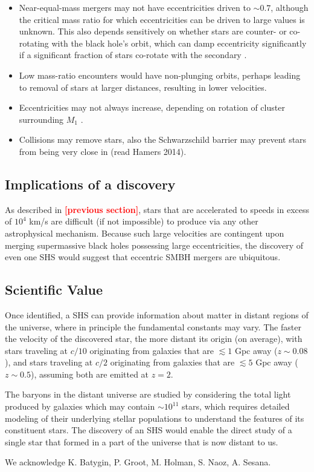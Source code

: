 \documentclass[a4paper,twocolumn]{emulateapj}
\newcommand{\colr}[1]{{\bf \textcolor{red}{[#1]}}}
\begin{document}
\begin{itemize}
\item Near-equal-mass mergers may not have eccentricities driven to $\sim 0.7$, although the critical mass ratio for which eccentricities can be driven to large values is unknown. This also depends sensitively on whether stars are counter- or co-rotating with the black hole's orbit, which can damp eccentricity significantly if a significant fraction of stars co-rotate with the secondary \citep{Sesana:2011a}.
\item Low mass-ratio encounters would have non-plunging orbits, perhaps leading to removal of stars at larger distances, resulting in lower velocities.
\item Eccentricities may not always increase, depending on rotation of cluster surrounding $M_{1}$ \citep{Dotti:2012a}.
\item Collisions may remove stars, also the Schwarzschild barrier may prevent stars from being very close in (read Hamers 2014).
\end{itemize}

\subsection{Implications of a discovery}
As described in \colr{previous section}, stars that are accelerated to speeds in excess of $10^{4}$ km/s are difficult (if not impossible) to produce via any other astrophysical mechanism. Because such large velocities are contingent upon merging supermassive black holes possessing large eccentricities, the discovery of even one SHS would suggest that eccentric SMBH mergers are ubiquitous.

\subsection{Scientific Value}
Once identified, a SHS can provide information about matter in distant regions of the universe, where in principle the fundamental constants may vary. The faster the velocity of the discovered star, the more distant its origin (on average), with stars traveling at $c/10$ originating from galaxies that are $\lesssim 1$ Gpc away ($z \sim 0.08$), and stars traveling at $c/2$ originating from galaxies that are $\lesssim 5$ Gpc away ($z \sim 0.5$), assuming both are emitted at $z = 2$.

The baryons in the distant universe are studied by considering the total light produced by galaxies which may contain $\sim 10^{11}$ stars, which requires detailed modeling of their underlying stellar populations to understand the features of its constituent stars. The discovery of an SHS would enable the direct study of a single star that formed in a part of the universe that is now distant to us. 

\acknowledgements
We acknowledge K. Batygin, P. Groot, M. Holman, S. Naoz, A. Sesana.



\end{document}
